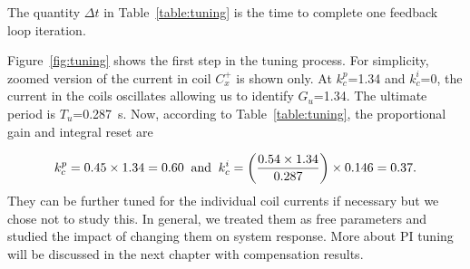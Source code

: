 
The quantity $\Delta t$ in Table~\ref{table:tuning} is the time to complete one feedback loop iteration.

Figure~\ref{fig:tuning} shows the first step in the tuning process. For simplicity, zoomed version of the current in coil $C_x^+$ is shown only. At $k_c^p$=1.34 and $k_c^i$=0, the current in the coils oscillates allowing us to identify $G_u$=1.34.  The ultimate period is $T_u$=0.287~s. Now, according to Table~\ref{table:tuning}, the proportional gain and integral reset are

\begin{equation}
    k_c^p=0.45\times1.34=0.60\;\;\text{and}\;\; k_c^i=\left(\frac{0.54 \times1.34}{0.287}\right)\times0.146=0.37{\rm .}
\end{equation}
They can be further tuned for the individual coil currents if necessary but we chose not to study this. In general, we treated them as free parameters and studied the impact of changing them on system response. More about PI tuning will be discussed in the next chapter with compensation results.






